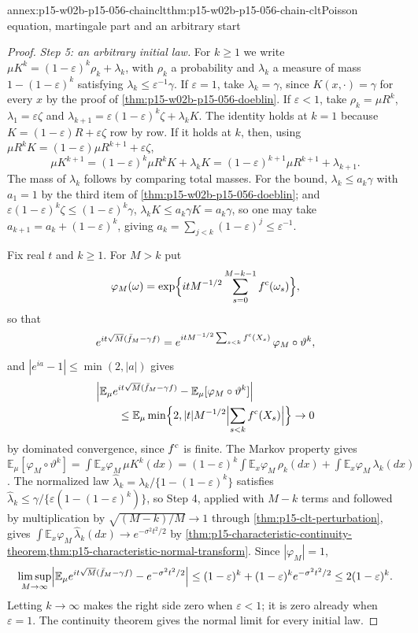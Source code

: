\begin{annexitem}{annex:p15-w02b-p15-056-chainclt}{thm:p15-w02b-p15-056-chain-clt}{Poisson equation, martingale part and an arbitrary start}
\begin{proof}
\emph{Step 5: an arbitrary initial law.} For \(k\geq1\) we write
\(\mu K^k=(1-\varepsilon)^k\rho_k+\lambda_k\), with \(\rho_k\) a probability
and \(\lambda_k\) a measure of mass \(1-(1-\varepsilon)^k\) satisfying
\(\lambda_k\leq\varepsilon^{-1}\gamma\). If \(\varepsilon=1\), take
\(\lambda_k=\gamma\), since \(K(x,\cdot)=\gamma\) for every \(x\) by the
proof of \cref{thm:p15-w02b-p15-056-doeblin}. If \(\varepsilon<1\), take
\(\rho_k=\mu R^k\), \(\lambda_1=\varepsilon\zeta\) and
\(\lambda_{k+1}=\varepsilon(1-\varepsilon)^k\zeta+\lambda_kK\). The identity
holds at \(k=1\) because \(K=(1-\varepsilon)R+\varepsilon\zeta\) row by row.
If it holds at \(k\), then, using
\(\mu R^kK=(1-\varepsilon)\mu R^{k+1}+\varepsilon\zeta\),
\[
 \mu K^{k+1}=(1-\varepsilon)^k\mu R^kK+\lambda_kK
 =(1-\varepsilon)^{k+1}\mu R^{k+1}+\lambda_{k+1}.
\]
The mass of \(\lambda_k\) follows by comparing total masses. For the bound,
\(\lambda_k\leq a_k\gamma\) with \(a_1=1\) by the third item of
\cref{thm:p15-w02b-p15-056-doeblin}; and
\(\varepsilon(1-\varepsilon)^k\zeta\leq(1-\varepsilon)^k\gamma\),
\(\lambda_kK\leq a_k\gamma K=a_k\gamma\), so one may take
\(a_{k+1}=a_k+(1-\varepsilon)^k\), giving
\(a_k=\sum_{j<k}(1-\varepsilon)^j\leq\varepsilon^{-1}\).

Fix real \(t\) and \(k\geq1\). For \(M>k\) put
\[
 \varphi_M(\omega)=\exp\Bigl\{itM^{-1/2}\sum_{s=0}^{M-k-1}f^{\rm c}(\omega_s)\Bigr\},
\]
so that
\[
 e^{it\sqrt M(\bar f_M-\gamma f)}=e^{itM^{-1/2}\sum_{s<k}f^{\rm c}(X_s)}\,
 \varphi_M\circ\vartheta^k,
\]
and \(|e^{ia}-1|\leq\min(2,|a|)\) gives
\[
\begin{split}
 &\Bigl|\mathbb E_\mu e^{it\sqrt M(\bar f_M-\gamma f)}-\mathbb E_\mu[\varphi_M\circ\vartheta^k]\Bigr|\\
 &\qquad\leq\mathbb E_\mu\min\Bigl\{2,|t|M^{-1/2}\Bigl|\sum_{s<k}f^{\rm c}(X_s)\Bigr|\Bigr\}\to0
\end{split}
\]
by dominated convergence, since \(f^{\rm c}\) is finite. The Markov
property gives
\(\mathbb E_\mu[\varphi_M\circ\vartheta^k]=\int\mathbb E_x\varphi_M\,\mu K^k(dx)
=(1-\varepsilon)^k\int\mathbb E_x\varphi_M\,\rho_k(dx)+\int\mathbb E_x\varphi_M\,\lambda_k(dx)\).
The normalized law \(\hat\lambda_k=\lambda_k/\{1-(1-\varepsilon)^k\}\)
satisfies \(\hat\lambda_k\leq\gamma/\{\varepsilon(1-(1-\varepsilon)^k)\}\),
so Step 4, applied with \(M-k\) terms and followed by multiplication by
\(\sqrt{(M-k)/M}\to1\) through \cref{thm:p15-clt-perturbation}, gives
\(\int\mathbb E_x\varphi_M\,\hat\lambda_k(dx)\to e^{-\sigma^2t^2/2}\) by
\cref{thm:p15-characteristic-continuity-theorem,thm:p15-characteristic-normal-transform}.
Since \(|\varphi_M|=1\),
\[
 \limsup_{M\to\infty}\Bigl|\mathbb E_\mu e^{it\sqrt M(\bar f_M-\gamma f)}-e^{-\sigma^2t^2/2}\Bigr|
 \leq(1-\varepsilon)^k+(1-\varepsilon)^ke^{-\sigma^2t^2/2}\leq2(1-\varepsilon)^k .
\]
Letting \(k\to\infty\) makes the right side zero when \(\varepsilon<1\); it
is zero already when \(\varepsilon=1\). The continuity theorem gives the
normal limit for every initial law.
\end{proof}
\end{annexitem}

